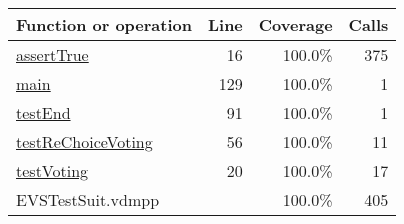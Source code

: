 \bigskip
\begin{longtable}{|l|r|r|r|}
\hline
Function or operation & Line & Coverage & Calls \\
\hline
\hline
\hyperref[assertTrue:16]{assertTrue} & 16&100.0\% & 375 \\
\hline
\hyperref[main:129]{main} & 129&100.0\% & 1 \\
\hline
\hyperref[testEnd:91]{testEnd} & 91&100.0\% & 1 \\
\hline
\hyperref[testReChoiceVoting:56]{testReChoiceVoting} & 56&100.0\% & 11 \\
\hline
\hyperref[testVoting:20]{testVoting} & 20&100.0\% & 17 \\
\hline
\hline
EVSTestSuit.vdmpp & & 100.0\% & 405 \\
\hline
\end{longtable}

